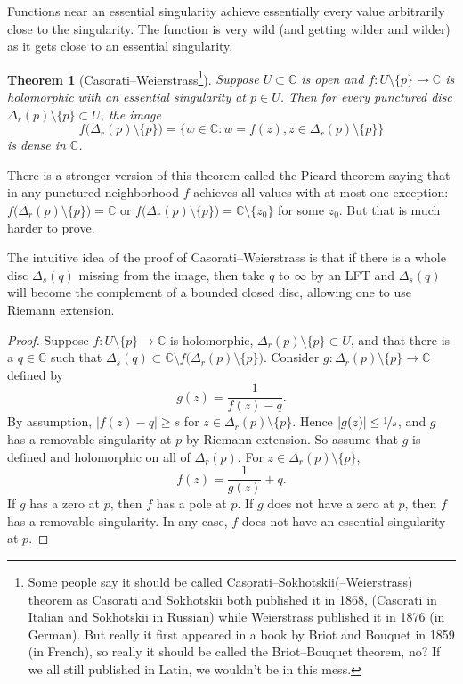 \documentclass[12pt,openany]{book}
\newcommand{\sabs}[1]{\lvert {#1} \rvert}
\newcommand{\C}{{\mathbb{C}}}
\theoremstyle{plain}
\newtheorem{thm}{Theorem}[section]
\theoremstyle{remark}
\theoremstyle{definition}
\theoremstyle{exercise}
\theoremstyle{example}
\begin{document}
Functions near an essential singularity achieve essentially every value
arbitrarily close to the singularity.  The function is very wild (and
getting wilder and wilder) as it gets close to an essential singularity.

\begin{thm}[Casorati--Weierstrass\footnote{%
Some people say it should be called Casorati--Sokhotskii(--Weierstrass) theorem as
Casorati and Sokhotskii both published it in 1868, (Casorati in Italian
and Sokhotskii in Russian) while Weierstrass published it in 1876 (in
German).  But really it first appeared in a book by Briot and Bouquet in
1859 (in French), so really it should be called the Briot--Bouquet theorem,
no?  If we all still published in Latin, we wouldn't be in this
mess.}]\label{thm:casoratiweierstrass}
Suppose $U \subset \C$ is open and $f \colon U \setminus \{ p \} \to \C$ is
holomorphic with
an essential singularity at $p \in U$.  Then for every punctured disc
$\Delta_r(p) \setminus \{ p \} \subset U$, the image
\begin{equation*}
f\bigl(\Delta_r(p) \setminus \{ p \} \bigr)
=
\bigl\{ w \in \C : w = f(z), z \in \Delta_r(p) \setminus \{ p \} \bigr\}
\end{equation*}
is dense in $\C$.
\end{thm}

There is a stronger version
of this theorem called the Picard theorem saying that in any
punctured neighborhood $f$ achieves all values with at most one exception:
$f\bigl(\Delta_r(p) \setminus \{ p \} \bigr) = \C$ or 
$f\bigl(\Delta_r(p) \setminus \{ p \} \bigr) = \C \setminus \{ z_0 \}$ for
some $z_0$.
But that is much harder to prove.

The intuitive idea of the proof of Casorati--Weierstrass is that if there
is a whole disc $\Delta_s(q)$ missing from the image, then take $q$ to
$\infty$ by an LFT and $\Delta_s(q)$ will become the complement of a bounded
closed disc, allowing one to use Riemann extension.

\begin{proof}
Suppose $f \colon U \setminus \{ p \} \to \C$ is holomorphic,
$\Delta_r(p) \setminus \{ p \} \subset U$,
and that
there is a $q \in \C$ such that $\Delta_s(q) \subset \C
\setminus 
f\bigl(\Delta_r(p) \setminus \{ p \} \bigr)$.
Consider $g \colon \Delta_r(p) \setminus \{p\} \to \C$ defined by
\begin{equation*}
g(z) = \frac{1}{f(z) - q} .
\end{equation*}
By assumption, $\sabs{f(z)-q} \geq s$ for $z \in \Delta_r(p) \setminus
\{p\}$.
Hence $\sabs{g(z)} \leq \nicefrac{1}{s}$, and $g$ has a removable
singularity at $p$ by Riemann extension.  So
assume that $g$ is defined and holomorphic on all of
$\Delta_r(p)$.  For $z \in \Delta_r(p) \setminus \{ p \}$,
\begin{equation*}
f(z) = \frac{1}{g(z)} + q .
\end{equation*}
If $g$ has a zero at $p$, then $f$ has a pole at $p$.  If $g$ does not
have a zero at $p$, then $f$ has a removable singularity.  In any case,
$f$ does not have an essential singularity at $p$.
\end{proof}
\end{document}
